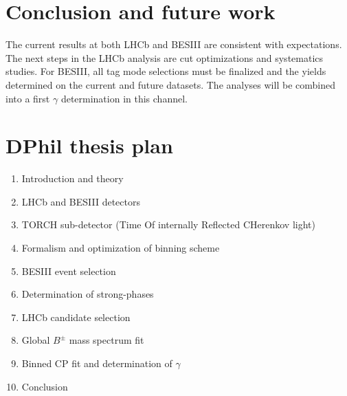 \documentclass[12pt, a4paper, notitlepage, onecolumn]{article}
\begin{document}
\section{Conclusion and future work}
\noindent The current results at both LHCb and BESIII are consistent with expectations. The next steps in the LHCb analysis are cut optimizations and systematics studies. For BESIII, all tag mode selections must be finalized and the yields determined on the current and future datasets. The analyses will be combined into a first $\gamma$ determination in this channel.




\newpage
\section*{DPhil thesis plan}
\begin{enumerate}
  \item{Introduction and theory}
  \item{LHCb and BESIII detectors}
  \item{TORCH sub-detector (Time Of internally Reflected CHerenkov light)}
  \item{Formalism and optimization of binning scheme}
  \item{BESIII event selection}
  \item{Determination of strong-phases}
  \item{LHCb candidate selection}
  \item{Global $B^\pm$ mass spectrum fit}
  \item{Binned CP fit and determination of $\gamma$}
  \item{Conclusion}
\end{enumerate}
\end{document}
